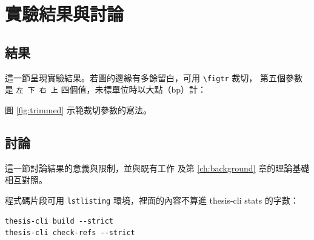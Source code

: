 
\chapter{實驗結果與討論}
\label{ch:results}

\section{結果}
\label{sec:results}

這一節呈現實驗結果。若圖的邊緣有多餘留白，可用 \verb|\figtr| 裁切，
第五個參數是 \verb|左 下 右 上| 四個值，未標單位時以大點（bp）計：


圖 \ref{fig:trimmed} 示範裁切參數的寫法。

\section{討論}
\label{sec:discussion}

這一節討論結果的意義與限制，並與既有工作 \cite{reckdahl2006graphics}
及第 \ref{ch:background} 章的理論基礎相互對照。

程式碼片段可用 \verb|lstlisting| 環境，裡面的內容不算進 thesis-cli stats 的字數：

\begin{lstlisting}
thesis-cli build --strict
thesis-cli check-refs --strict
\end{lstlisting}
